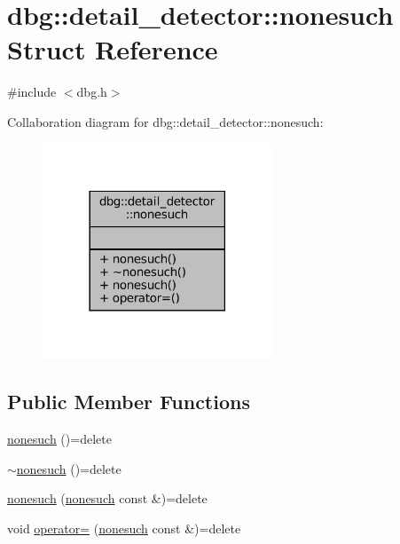 \hypertarget{structdbg_1_1detail__detector_1_1nonesuch}{}\section{dbg\+:\+:detail\+\_\+detector\+:\+:nonesuch Struct Reference}
\label{structdbg_1_1detail__detector_1_1nonesuch}


{\ttfamily \#include $<$dbg.\+h$>$}



Collaboration diagram for dbg\+:\+:detail\+\_\+detector\+:\+:nonesuch\+:
\nopagebreak
\begin{figure}[H]
\begin{center}
\leavevmode
\includegraphics[width=194pt]{structdbg_1_1detail__detector_1_1nonesuch__coll__graph}
\end{center}
\end{figure}
\subsection*{Public Member Functions}
\begin{DoxyCompactItemize}
\item 
\hyperlink{structdbg_1_1detail__detector_1_1nonesuch_af18fc7da3a412a23ac293cba85bf322b}{nonesuch} ()=delete
\item 
\hyperlink{structdbg_1_1detail__detector_1_1nonesuch_aae35d90996534c096275383b71c797b7}{$\sim$nonesuch} ()=delete
\item 
\hyperlink{structdbg_1_1detail__detector_1_1nonesuch_a82c9bfc90b56b542819d8df5af7cebe6}{nonesuch} (\hyperlink{structdbg_1_1detail__detector_1_1nonesuch}{nonesuch} const \&)=delete
\item 
void \hyperlink{structdbg_1_1detail__detector_1_1nonesuch_af0d1b2ab32ace678e2c9d95684d1917b}{operator=} (\hyperlink{structdbg_1_1detail__detector_1_1nonesuch}{nonesuch} const \&)=delete
\end{DoxyCompactItemize}


